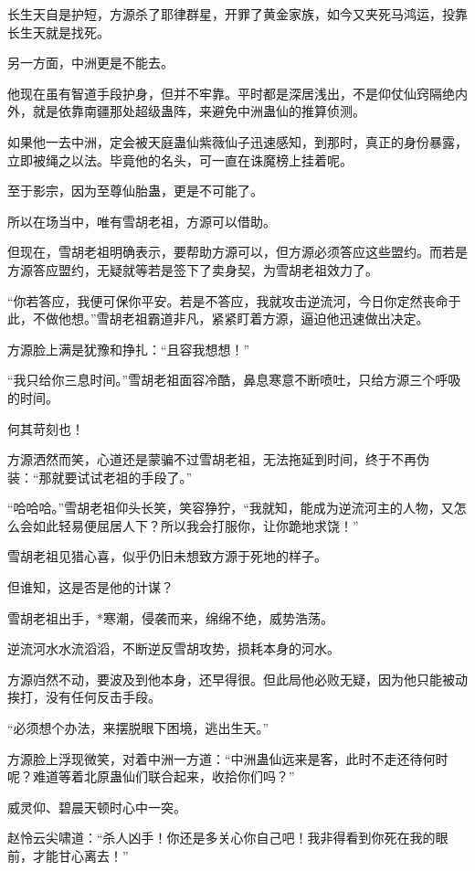 \begin{this_body}
长生天自是护短，方源杀了耶律群星，开罪了黄金家族，如今又夹死马鸿运，投靠长生天就是找死。

另一方面，中洲更是不能去。

他现在虽有智道手段护身，但并不牢靠。平时都是深居浅出，不是仰仗仙窍隔绝内外，就是依靠南疆那处超级蛊阵，来避免中洲蛊仙的推算侦测。

如果他一去中洲，定会被天庭蛊仙紫薇仙子迅速感知，到那时，真正的身份暴露，立即被绳之以法。毕竟他的名头，可一直在诛魔榜上挂着呢。

至于影宗，因为至尊仙胎蛊，更是不可能了。

所以在场当中，唯有雪胡老祖，方源可以借助。

但现在，雪胡老祖明确表示，要帮助方源可以，但方源必须答应这些盟约。而若是方源答应盟约，无疑就等若是签下了卖身契，为雪胡老祖效力了。

“你若答应，我便可保你平安。若是不答应，我就攻击逆流河，今日你定然丧命于此，不做他想。”雪胡老祖霸道非凡，紧紧盯着方源，逼迫他迅速做出决定。

方源脸上满是犹豫和挣扎：“且容我想想！”

“我只给你三息时间。”雪胡老祖面容冷酷，鼻息寒意不断喷吐，只给方源三个呼吸的时间。

何其苛刻也！

方源洒然而笑，心道还是蒙骗不过雪胡老祖，无法拖延到时间，终于不再伪装：“那就要试试老祖的手段了。”

“哈哈哈。”雪胡老祖仰头长笑，笑容狰狞，“我就知，能成为逆流河主的人物，又怎么会如此轻易便屈居人下？所以我会打服你，让你跪地求饶！”

雪胡老祖见猎心喜，似乎仍旧未想致方源于死地的样子。

但谁知，这是否是他的计谋？

雪胡老祖出手，*寒潮，侵袭而来，绵绵不绝，威势浩荡。

逆流河水水流滔滔，不断逆反雪胡攻势，损耗本身的河水。

方源岿然不动，要波及到他本身，还早得很。但此局他必败无疑，因为他只能被动挨打，没有任何反击手段。

“必须想个办法，来摆脱眼下困境，逃出生天。”

方源脸上浮现微笑，对着中洲一方道：“中洲蛊仙远来是客，此时不走还待何时呢？难道等着北原蛊仙们联合起来，收拾你们吗？”

威灵仰、碧晨天顿时心中一突。

赵怜云尖啸道：“杀人凶手！你还是多关心你自己吧！我非得看到你死在我的眼前，才能甘心离去！”


\end{this_body}
